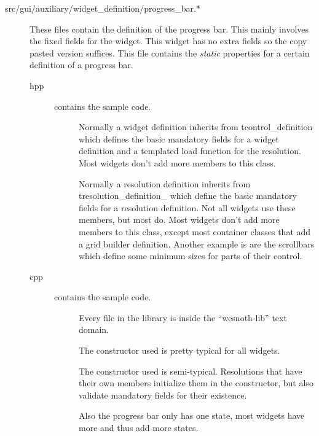 \begin{description}

\item[src/gui/auxiliary/widget\_definition/progress\_bar.*]
	These files contain the definition of the progress bar. This mainly involves
	the fixed fields for the widget. This widget has no extra fields so the copy
	pasted version suffices. This file contains the \emph{static} properties for
	a certain definition of a progress bar.

\begin{description}
\item[hpp]  contains the sample code.
	\begin{description}
	\item[] Normally a
		widget definition inherits from tcontrol\_definition which defines the
		basic mandatory fields for a widget definition and a templated load
		function for the resolution. Most widgets don't add more members to this
		class.
	\item[] Normally a resolution
		definition inherits from tresolution\_definition\_ which define the
		basic mandatory fields for a resolution definition. Not all widgets use
		these members, but most do. Most widgets don't add more members to this
		class, except most container classes that add a grid builder
		definition. Another example is are the scrollbars which define some
		minimum sizes for parts of their control.
	\end{description}

\item[cpp]  contains the sample code.
	\begin{description}
	\item[] Every file in the library
		is inside the ``wesnoth-lib'' text domain.
	\item[] The constructor used is
		pretty typical for all widgets.
	\item[] The
		constructor used is semi-typical. Resolutions that have their own
		members initialize them in the constructor, but also validate mandatory
		fields for their existence.

		Also the progress bar only has one state, most widgets have more and
		thus add more states.


\end{description}
\end{description}
\end{description}

